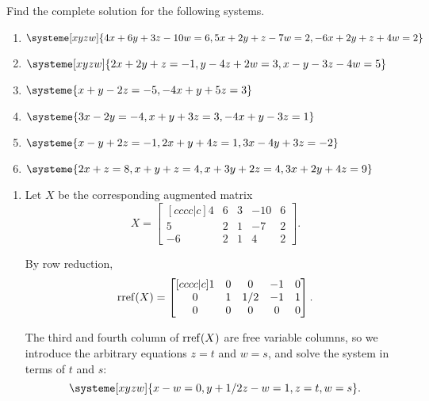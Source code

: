 \begin{exercises}
	\begin{problist}
		\prob Find the complete solution for the following systems.
		\begin{enumerate}
			\item $\systeme[xyzw]{4x+6y+3z-10w=6,5x+2y+z-7w=2,-6x+2y+z+4w=2}$
			\item $\systeme[xyzw]{2x+2y+z=-1,y-4z+2w=3,x-y-3z-4w=5}$
			\item $\systeme{x+y-2z=-5,-4x+y+5z=3}$
			\item $\systeme{3x-2y=-4,x+y+3z=3,-4x+y-3z=1}$
			\item $\systeme{x-y+2z=-1,2x+y+4z=1,3x-4y+3z=-2}$
			\item $\systeme{2x+z=8,x+y+z=4,x+3y+2z=4,3x+2y+4z=9}$
		\end{enumerate}
		\begin{solution}
			\begin{enumerate}
				\item 
				Let $X$ be the corresponding augmented matrix
				\[
					X=
					\begin{bmatrix}[cccc|c]
						4 & 6 & 3 & -10 & 6\\
						5 & 2 & 1 & -7 & 2\\
						-6 & 2 & 1 & 4 & 2
					\end{bmatrix}.
				\]
				
				By row reduction,
				\[
					\operatorname{rref}(X)=
					\begin{bmatrix}[cccc|c]
						1 & 0 & 0 & -1 & 0\\
						0 & 1 & 1/2 & -1 & 1\\
						0 & 0 & 0 & 0 & 0
					\end{bmatrix}.
				\]
				
				The third and fourth column of $\operatorname{rref}(X)$ are free variable columns, so we introduce the arbitrary equations $z=t$ and $w=s$, and solve the system in terms of $t$ and $s$:
				\[
					\systeme[xyzw]{x-w=0,y+1/2z-w=1,z=t,w=s}.
				\]
				

\end{enumerate}
\end{solution}
\end{problist}
\end{exercises}
